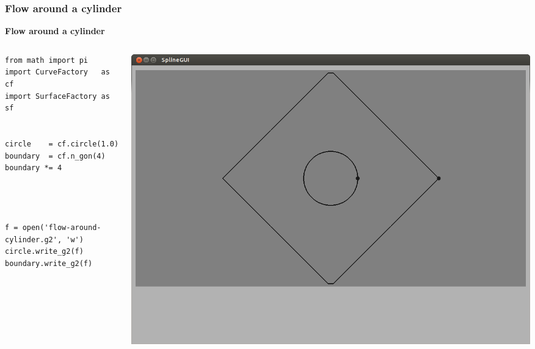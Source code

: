 \documentclass{beamer}
\theoremstyle{plain}
\theoremstyle{definition}
\begin{document}
\begin{frame}[fragile]
\frametitle{Flow around a cylinder}
\textbf{Flow around a cylinder}

\begin{columns}
    \begin{column}{.50\linewidth}
        \begin{listing}[H]
            \tiny
            \begin{verbatim}
from math import pi
import CurveFactory   as cf
import SurfaceFactory as sf


circle    = cf.circle(1.0)
boundary  = cf.n_gon(4)
boundary *= 4




f = open('flow-around-cylinder.g2', 'w')
circle.write_g2(f)
boundary.write_g2(f)
            \end{verbatim}
        \end{listing}
    \end{column}
    \begin{column}{.45\linewidth}
        \includegraphics[width=\linewidth]{cylinder1}
    \end{column}
\end{columns}

\end{frame}

\end{document}
